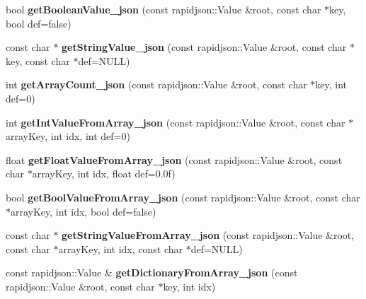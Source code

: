 \begin{DoxyCompactItemize}
bool {\bfseries get\+Boolean\+Value\+\_\+json} (const rapidjson\+::\+Value \&root, const char $\ast$key, bool def=false)
\item 
\mbox{\label{classcocostudio_1_1DictionaryHelper_abe59ad8ec6ab505cd6e8f3b7a92c5aa0}} 
const char $\ast$ {\bfseries get\+String\+Value\+\_\+json} (const rapidjson\+::\+Value \&root, const char $\ast$key, const char $\ast$def=N\+U\+LL)
\item 
\mbox{\label{classcocostudio_1_1DictionaryHelper_ac168e7100d9fa43549ca6f418464df18}} 
int {\bfseries get\+Array\+Count\+\_\+json} (const rapidjson\+::\+Value \&root, const char $\ast$key, int def=0)
\item 
\mbox{\label{classcocostudio_1_1DictionaryHelper_ad1a8821281e091b1cf4edd944d54816c}} 
int {\bfseries get\+Int\+Value\+From\+Array\+\_\+json} (const rapidjson\+::\+Value \&root, const char $\ast$array\+Key, int idx, int def=0)
\item 
\mbox{\label{classcocostudio_1_1DictionaryHelper_a1f6d26bf7b84e5db0c892b9563c3460b}} 
float {\bfseries get\+Float\+Value\+From\+Array\+\_\+json} (const rapidjson\+::\+Value \&root, const char $\ast$array\+Key, int idx, float def=0.\+0f)
\item 
\mbox{\label{classcocostudio_1_1DictionaryHelper_a818c93c71f1318cdefb131720f114bf7}} 
bool {\bfseries get\+Bool\+Value\+From\+Array\+\_\+json} (const rapidjson\+::\+Value \&root, const char $\ast$array\+Key, int idx, bool def=false)
\item 
\mbox{\label{classcocostudio_1_1DictionaryHelper_afa2b0a6a38a85568b6a0649d45e7ed17}} 
const char $\ast$ {\bfseries get\+String\+Value\+From\+Array\+\_\+json} (const rapidjson\+::\+Value \&root, const char $\ast$array\+Key, int idx, const char $\ast$def=N\+U\+LL)
\item 
\mbox{\label{classcocostudio_1_1DictionaryHelper_ae1ac151ee46ae8a6485327d7d3b2aede}} 
const rapidjson\+::\+Value \& {\bfseries get\+Dictionary\+From\+Array\+\_\+json} (const rapidjson\+::\+Value \&root, const char $\ast$key, int idx)

\end{DoxyCompactItemize}
